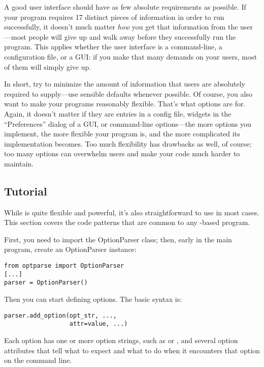 A good user interface should have as few absolute requirements as
possible.  If your program requires 17 distinct pieces of information in
order to run successfully, it doesn't much matter \emph{how} you get that
information from the user{---}most people will give up and walk away
before they successfully run the program.  This applies whether the user
interface is a command-line, a configuration file, or a GUI: if you make
that many demands on your users, most of them will simply give up.

In short, try to minimize the amount of information that users are
absolutely required to supply{---}use sensible defaults whenever
possible.  Of course, you also want to make your programs reasonably
flexible.  That's what options are for.  Again, it doesn't matter if
they are entries in a config file, widgets in the ``Preferences'' dialog
of a GUI, or command-line options{---}the more options you implement, the
more flexible your program is, and the more complicated its
implementation becomes.  Too much flexibility has drawbacks as well, of
course; too many options can overwhelm users and make your code much
harder to maintain.


\subsection{Tutorial\label{optparse-tutorial}}

While  is quite flexible and powerful, it's also straightforward to
use in most cases.  This section covers the code patterns that are
common to any -based program.

First, you need to import the OptionParser class; then, early in the
main program, create an OptionParser instance:
\begin{verbatim}
from optparse import OptionParser
[...]
parser = OptionParser()
\end{verbatim}

Then you can start defining options.  The basic syntax is:
\begin{verbatim}
parser.add_option(opt_str, ...,
                  attr=value, ...)
\end{verbatim}

Each option has one or more option strings, such as  or
, and several option attributes that tell  what to
expect and what to do when it encounters that option on the command
line.

